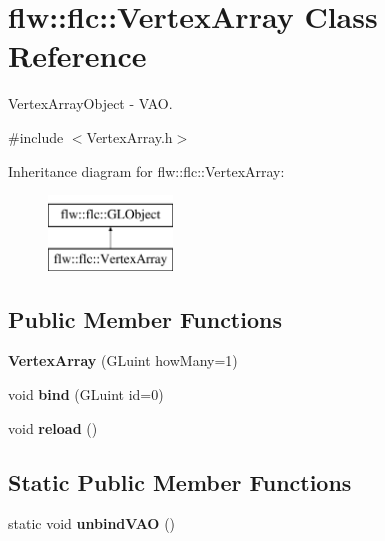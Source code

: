\hypertarget{classflw_1_1flc_1_1VertexArray}{}\section{flw\+:\+:flc\+:\+:Vertex\+Array Class Reference}
\label{classflw_1_1flc_1_1VertexArray}


Vertex\+Array\+Object -\/ V\+AO.  




{\ttfamily \#include $<$Vertex\+Array.\+h$>$}

Inheritance diagram for flw\+:\+:flc\+:\+:Vertex\+Array\+:\begin{figure}[H]
\begin{center}
\leavevmode
\includegraphics[height=2.000000cm]{classflw_1_1flc_1_1VertexArray}
\end{center}
\end{figure}
\subsection*{Public Member Functions}
\begin{DoxyCompactItemize}
\item 
{\bfseries Vertex\+Array} (G\+Luint how\+Many=1)\hypertarget{classflw_1_1flc_1_1VertexArray_ad8fb32bc36e3f00b86b1b04a9892669b}{}\label{classflw_1_1flc_1_1VertexArray_ad8fb32bc36e3f00b86b1b04a9892669b}

\item 
void {\bfseries bind} (G\+Luint id=0)\hypertarget{classflw_1_1flc_1_1VertexArray_a39a6e1517e1a32a225dd16a88e3492bf}{}\label{classflw_1_1flc_1_1VertexArray_a39a6e1517e1a32a225dd16a88e3492bf}

\item 
void {\bfseries reload} ()\hypertarget{classflw_1_1flc_1_1VertexArray_ac622afe3735e3ff34df3b2d74fdd57aa}{}\label{classflw_1_1flc_1_1VertexArray_ac622afe3735e3ff34df3b2d74fdd57aa}

\end{DoxyCompactItemize}
\subsection*{Static Public Member Functions}
\begin{DoxyCompactItemize}
\item 
static void {\bfseries unbind\+V\+AO} ()\hypertarget{classflw_1_1flc_1_1VertexArray_ac879f5d878b5eb8265ed2b1bd119ca7a}{}\label{classflw_1_1flc_1_1VertexArray_ac879f5d878b5eb8265ed2b1bd119ca7a}

\end{DoxyCompactItemize}
